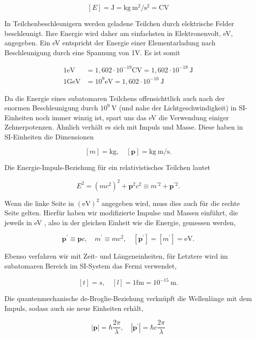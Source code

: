 \documentclass[10pt, letterpaper]{article}
\begin{document}
$$
[E]=\mathrm{J}=\mathrm{kg} \mathrm{~m}^{2} / \mathrm{s}^{2}=\mathrm{CV}
$$

In Teilchenbeschleunigern werden geladene Teilchen durch elektrische Felder beschleunigt. Ihre Energie wird daher am einfachsten in Elektronenvolt, eV, angegeben. Ein eV entspricht der Energie einer Elementarladung nach Beschleunigung durch eine Spannung von 1V. Es ist somit

$$
\begin{aligned}
1 \mathrm{eV} & =1,602 \cdot 10^{-19} \mathrm{CV}=1,602 \cdot 10^{-19} \mathrm{~J} \\
1 \mathrm{GeV} & =10^{9} \mathrm{eV}=1,602 \cdot 10^{-10} \mathrm{~J}
\end{aligned}
$$

Da die Energie eines subatomaren Teilchens offensichttlich auch nach der enormen Beschleunigung durch $10^{9} \mathrm{~V}$ (und nahe der Lichtgeschwindigkeit) in SI-Einheiten noch immer winzig ist, spart uns das eV die Verwendung einiger Zehnerpotenzen. Ähnlich verhält es sich mit Impuls und Masse. Diese haben in SI-Einheiten die Dimensionen

$$
[m]=\mathrm{kg}, \quad[\mathbf{p}]=\mathrm{kg} \mathrm{~m} / \mathrm{s} .
$$

Die Energie-Impuls-Beziehung für ein relativistisches Teilchen lautet

$$
E^{2}=\left(m c^{2}\right)^{2}+\mathbf{p}^{2} c^{2} \equiv m^{\prime 2}+\mathbf{p}^{\prime 2} .
$$

Wenn die linke Seite in $(\mathrm{eV})^{2}$ angegeben wird, muss dies auch für die rechte Seite gelten. Hierfür haben wir modifizierte Impulse und Massen einführt, die jeweils in eV , also in der gleichen Einheit wie die Energie, gemessen werden,

$$
\mathbf{p}^{\prime} \equiv \mathbf{p} c, \quad m^{\prime} \equiv m c^{2}, \quad\left[\mathbf{p}^{\prime}\right]=\left[m^{\prime}\right]=\mathrm{eV} .
$$

Ebenso verfahren wir mit Zeit- und Längeneinheiten, für Letztere wird im subatomaren Bereich im SI-System das Fermi verwendet,

$$
[t]=s, \quad[l]=1 \mathrm{fm}=10^{-15} \mathrm{~m} .
$$

Die quantenmechanische de-Broglie-Beziehung verknüpft die Wellenlänge mit dem Impuls, sodass auch sie neue Einheiten erhält,

$$
|\mathbf{p}|=\hbar \frac{2 \pi}{\lambda}, \quad\left|\mathbf{p}^{\prime}\right|=\hbar c \frac{2 \pi}{\lambda}
$$
\end{document}
